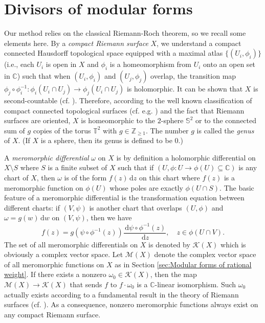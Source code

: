 \documentclass[12pt]{amsart}
\numberwithin{equation}{section}
\theoremstyle{plain}
\theoremstyle{definition}
\theoremstyle{remark}
\newcommand\diff{\,\mathrm{d}}
\newcommand\numC{\mathbb{C}}
\newcommand\numgeq[2]{\mathbb{#1}_{\geq #2}}
\begin{document}
\section{Divisors of modular forms}
\label{sec:Divisors of modular forms}
Our method relies on the classical Riemann-Roch theorem, so we recall some elements here. By a \emph{compact Riemann surface} $X$, we understand a compact connected Hausdorff topological space equipped with a maximal atlas $\{(U_i,\phi_i)\}$ (i.e., each $U_i$ is open in $X$ and $\phi_i$ is a homeomorphism from $U_i$ onto an open set in $\numC$) such that when $(U_i,\phi_i)$ and $(U_j,\phi_j)$ overlap, the transition map $\phi_j\circ\phi_i^{-1}\colon\phi_i(U_i\cap U_j)\rightarrow\phi_j(U_i\cap U_j)$ is holomorphic. It can be shown that $X$ is second-countable (cf. \cite[p. 88]{Fri11}). Therefore, according to the well known classification of compact connected topological surfaces (cf. e.g. \cite[Theorem 10.22]{Lee11}) and the fact that Riemann surfaces are oriented, $X$ is homeomorphic to the $2$-sphere $\mathbb{S}^2$ or to the connected sum of $g$ copies of the torus $\mathbb{T}^2$ with $g\in\numgeq{Z}{1}$. The number $g$ is called the \emph{genus} of $X$. (If $X$ is a sphere, then its genus is defined to be $0$.)

A \emph{meromorphic differential} $\omega$ on $X$ is by definition a holomorphic differential on $X\setminus S$ where $S$ is a finite subset of $X$ such that if $(U,\phi\colon U\rightarrow\phi(U)\subseteq\numC)$ is any chart of $X$, then $\omega$ is of the form $f(z)\diff z$ on this chart where $f(z)$ is a meromorphic function on $\phi(U)$ whose poles are exactly $\phi(U\cap S)$. The basic feature of a meromorphic differential is the transformation equation between different charts: if $(V,\psi)$ is another chart that overlaps $(U,\phi)$ and $\omega=g(w)\diff w$ on $(V,\psi)$, then we have
\begin{equation*}
f(z)=g(\psi\circ\phi^{-1}(z))\frac{\diff \psi\circ\phi^{-1}(z)}{\diff z},\quad z\in\phi(U\cap V).
\end{equation*}
The set of all meromorphic differentials on $X$ is denoted by $\mathscr{K}(X)$ which is obviously a complex vector space. Let $\mathscr{M}(X)$ denote the complex vector space of all meromorphic functions on $X$ as in Section \ref{sec:Modular forms of rational weight}. If there exists a nonzero $\omega_0\in\mathscr{K}(X)$, then the map $\mathscr{M}(X)\rightarrow\mathscr{K}(X)$ that sends $f$ to $f\cdot\omega_0$ is a $\numC$-linear isomorphism. Such $\omega_0$ actually exists according to a fundamental result in the theory of Riemann surfaces (cf. \cite[Theorem 1.10, Chapter IV]{Fri11}). As a consequence, nonzero meromorphic functions always exist on any compact Riemann surface.
\end{document}

